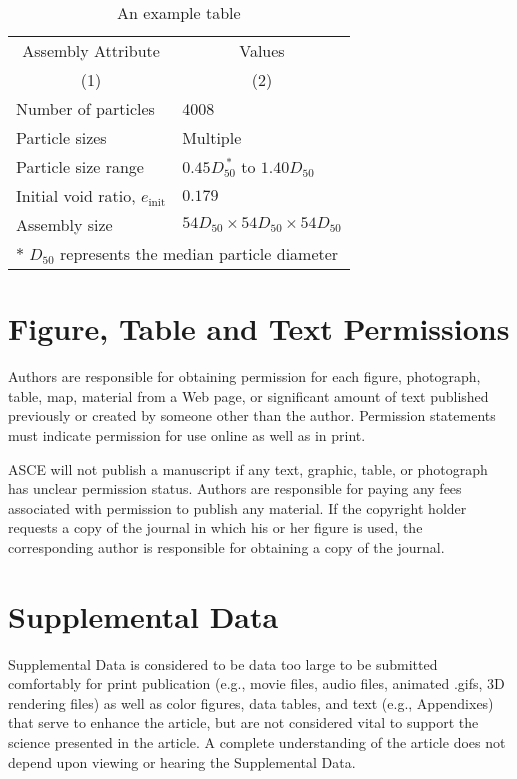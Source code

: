 \documentclass[Journal,letterpaper]{ascelike-new}
\begin{document}
\begin{table}
\caption{An example table}
\label{table:assembly}
\centering
\small
\renewcommand{\arraystretch}{1.25}
\begin{tabular}{l l}
\hline\hline
\multicolumn{1}{c}{Assembly Attribute} &
\multicolumn{1}{c}{Values} \\
\multicolumn{1}{c}{(1)} &
\multicolumn{1}{c}{(2)} \\
\hline
Number of particles & 4008 \\
Particle sizes & Multiple  \\
Particle size range & $0.45D_{50}^{\:\ast}$ to $1.40D_{50}$ \\
Initial void ratio, $e_{\mathrm{init}}$ & $0.179$ \\
Assembly size & $54D_{50} \times 54D_{50} \times 54D_{50}$ \\
\hline
\multicolumn{2}{l}{$\ast$ $D_{50}$ represents the median particle diameter} \\
\hline\hline
\end{tabular}
\normalsize
\end{table}

\section{Figure, Table and Text Permissions}

Authors are responsible for obtaining permission for each figure, photograph, table, map, material from a Web page, or significant amount of text published previously or created by someone other than the author. Permission statements must indicate permission for use online as well as in print.

ASCE will not publish a manuscript if any text, graphic, table, or photograph has unclear permission status. Authors are responsible for paying any fees associated with permission to publish any material. If the copyright holder requests a copy of the journal in which his or her figure is used, the corresponding author is responsible for obtaining a copy of the journal.

\section{Supplemental Data}

Supplemental Data is considered to be data too large to be submitted comfortably for print publication (e.g., movie files, audio files, animated .gifs, 3D rendering files) as well as color figures, data tables, and text (e.g., Appendixes) that serve to enhance the article, but are not considered vital to support the science presented in the article. A complete understanding of the article does not depend upon viewing or hearing the Supplemental Data.
\end{document}
